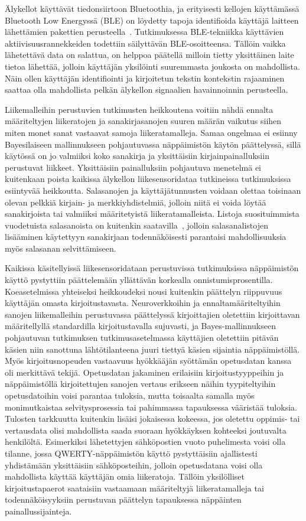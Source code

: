 \documentclass[finnish]{tktltiki2}
\theoremstyle{definition}
\theoremstyle{remark}
\begin{document}
Älykellot käyttävät tiedonsiirtoon Bluetoothia, ja erityisesti kellojen käyttämässä Bluetooth Low Energyssä (BLE) on löydetty tapoja identifioida  käyttäjä laitteen lähettämien pakettien perusteella~\cite{das}. Tutkimuksessa BLE-tekniikka käyttävien aktiivisuusrannekkeiden todettiin säilyttävän BLE-osoitteensa. Tällöin vaikka lähetettävä data on salattua, on helppoa päätellä milloin tietty yksittäinen laite tietoa lähettää, jolloin käyttäjän yksilöinti suuremmasta joukosta on mahdollista. Näin ollen käyttäjän identifiointi ja kirjoitetun tekstin kontekstin rajaaminen saattaa olla mahdollista pelkän älykellon signaalien havainnoinnin perusteella. 

Liikemalleihin perustuvien tutkimusten heikkoutena voitiin nähdä ennalta määriteltyjen liikeratojen ja sanakirjasanojen suuren määrän vaikutus siihen miten monet sanat vastaavat samoja liikeratamalleja. Samaa ongelmaa ei esiinny Bayesilaiseen mallinnukseen pohjautuvassa näppäimistön käytön päättelyssä, sillä käytössä on jo valmiiksi koko sanakirja ja yksittäisiin kirjainpainalluksiin perustuvat liikkeet. Yksittäisiin painalluksiin pohjautuva menetelmä ei kuitenkaan poista kaikissa älykellon liikesensoridataa tutkineissa tutkimuksissa esiintyvää heikkoutta. Salasanojen ja käyttäjätunnusten voidaan olettaa toisinaan olevan pelkkiä kirjain- ja merkkiyhdistelmiä, jolloin niitä ei voida löytää sanakirjoista tai valmiiksi määritetyistä liikeratamalleista. Listoja suosituimmista vuodetuista salasanoista on kuitenkin saatavilla~\cite{pw}, jolloin salasanalistojen lisääminen käytettyyn sanakirjaan todennäköisesti parantaisi mahdollisuuksia myös salasanan selvittämiseen. 

Kaikissa käsitellyissä liikesensoridataan perustuvissa tutkimuksissa näppäimistön käyttö pystyttiin päättelemään yllättävän korkealla onnistumisprosentilla. Koeasetelmissa yhteiseksi heikkoudeksi nousi kuitenkin päättelyn riippuvuus käyttäjän omasta kirjoitustavasta. Neuroverkkoihin ja ennaltamääriteltyihin sanojen liikemalleihin perustuvassa päättelyssä kirjoittajien oletettiin kirjoittavan määritellyllä standardilla kirjoitustavalla sujuvasti, ja  Bayes-mallinnukseen pohjautuvan tutkimuksen tutkimusasetelmassa käyttäjien oletettiin pitävän käsien niin sanottuna lähtötilanteena juuri tiettyä käsien sijaintia näppäimistöllä. Myös kirjoitusnopeuden vastaavuus hyökkääjän syöttämän opetusdatan kanssa oli merkittävä tekijä.
Opetusdatan jakaminen erilaisiin kirjoitustyyppeihin ja näppäimistöllä kirjoitettujen sanojen vertaus erikseen näihin tyypiteltyihin opetusdatoihin voisi parantaa tuloksia, mutta toisaalta samalla myös monimutkaistaa selvitysprosessia tai pahimmassa tapauksessa vääristää tuloksia. Tulosten tarkkuutta kuitenkin lisäisi jokaisessa kokeessa, jos oletettu oppimis- tai vertausdata olisi mahdollista saada suoraan hyökkäyksen kohteeksi joutuvalta henkilöltä. Esimerkiksi lähetettyjen sähköpostien vuoto puhelimesta voisi olla tilanne, jossa QWERTY-näppäimistön käyttö pystyttäisiin ajallistesti yhdistämään yksittäisiin sähköposteihin, jolloin opetusdatana voisi olla mahdollista käyttää käyttäjän omia liikeratoja. Tällöin yksilölliset kirjoitustapaerot saataisiin vastaamaan määriteltyjä liikeratamalleja tai todennäköisyyksiin perustuvan päättelyn tapauksessa näppäinten painallussijainteja.
\end{document}
